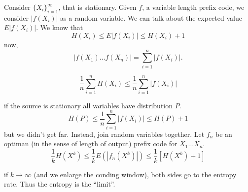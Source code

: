 Consider $\{X_i\}_{i=1}^\infty$, that is stationary. Given $f$, a variable length prefix code, we consider $|f(X_i)|$ as a random variable. We can talk about the expected value $E|f(X_i)|$. We know that
\[
 H(X_i) \leq E|f(X_i)| \leq H(X_i) + 1
\]
now,
\[
|f(X_1)\ldots f(X_n)| = \sum_{i=1}^n|f(X_i)|. 
\]

\[
 \dfrac{1}{n}\sum_{i=1}^n H(X_i) \leq\dfrac{1}{n}\sum_{i=1}^n |f(X_i)|
\]

if the source is stationary all variables have distribution $P$.
\[
 H(P) \leq \dfrac{1}{n} \sum_{i = 1}^n |f(X_i)| \leq H(P) + 1
\]
but we didn't get far. Instead, join random variables together. Let $f_n$ be an optiman (in the sense of length of output) prefix code for $X_1 \ldots X_n$.
\[
 \dfrac{1}{k}H(X^k) \leq \dfrac{1}{k}E(|f_n(X^k)|) \leq \dfrac{1}{k}[H(X^k) + 1]
\]

if $k \rightarrow \infty$ (and we enlarge the conding window), both sides go to the entropy rate. Thus the entropy is the ``limit''.
